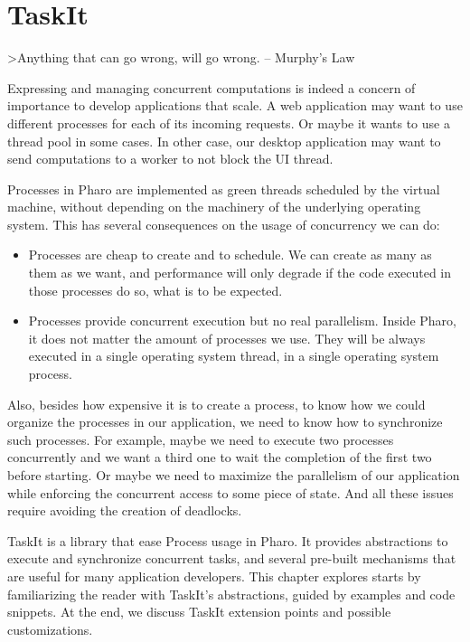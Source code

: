 \documentclass[10pt,twoside,english]{_support/latex/sbabook/sbabook}
\begin{document}
\frontmatter
\pagestyle{plain}

\tableofcontents*
\clearpage\listoffigures

\mainmatter

\part{TaskIt}
\textgreater{}Anything that can go wrong, will go wrong. -- Murphy's Law

Expressing and managing concurrent computations is indeed a concern of importance to develop applications that scale. A web application may want to use different processes for each of its incoming requests. Or maybe it wants to use a thread pool in some cases. In other case, our desktop application may want to send computations to a worker to not block the UI thread. 

Processes in Pharo are implemented as green threads scheduled by the virtual machine, without depending on the machinery of the underlying operating system. This has several consequences on the usage of concurrency we can do:

\begin{itemize}
\item Processes are cheap to create and to schedule. We can create as many as them as we want, and performance will only degrade if the code executed in those processes do so, what is to be expected.
\item Processes provide concurrent execution but no real parallelism. Inside Pharo, it does not matter the amount of processes we use. They will be always executed in a single operating system thread, in a single operating system process.
\end{itemize}

Also, besides how expensive it is to create a process, to know how we could organize the processes in our application, we need to know how to synchronize such processes. For example, maybe we need to execute two processes concurrently and we want a third one to wait the completion of the first two before starting. Or maybe we need to maximize the parallelism of our application while enforcing the concurrent access to some piece of state. And all these issues require avoiding the creation of deadlocks.

TaskIt is a library that ease Process usage in Pharo. It provides abstractions to execute and synchronize concurrent tasks, and several pre-built mechanisms that are useful for many application developers. This chapter explores starts by familiarizing the reader with TaskIt's abstractions, guided by examples and code snippets. At the end, we discuss TaskIt extension points and possible customizations.
\end{document}
